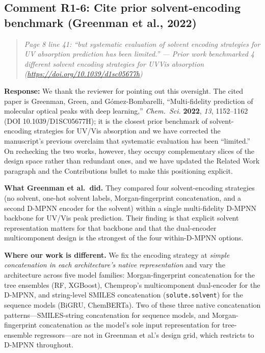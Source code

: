 \documentclass[11pt]{article}
\newenvironment{reviewer}{%
  \begin{quote}\itshape\color{black!70}}{%
  \end{quote}}
\newcommand{\response}[1]{\noindent\textbf{Response:} #1\par\medskip}
\begin{document}
\subsection*{Comment R1-6: Cite prior solvent-encoding benchmark (Greenman et al., 2022)}
\begin{reviewer}
Page 8 line 41: ``but systematic evaluation of solvent encoding strategies for UV absorption prediction has been limited.'' --- Prior work benchmarked 4 different solvent encoding strategies for UVVis absorption (\url{https://doi.org/10.1039/d1sc05677h})
\end{reviewer}

\response{We thank the reviewer for pointing out this oversight. The cited paper is Greenman, Green, and G\'omez-Bombarelli, ``Multi-fidelity prediction of molecular optical peaks with deep learning,'' \textit{Chem.\ Sci.} \textbf{2022}, \textit{13}, 1152--1162 (DOI 10.1039/D1SC05677H); it is the closest prior benchmark of solvent-encoding strategies for UV/Vis absorption and we have corrected the manuscript's previous overclaim that systematic evaluation has been ``limited.'' On rechecking the two works, however, they occupy complementary slices of the design space rather than redundant ones, and we have updated the Related Work paragraph and the Contributions bullet to make this positioning explicit.

\textbf{What Greenman et al.\ did.} They compared four solvent-encoding strategies (no solvent, one-hot solvent labels, Morgan-fingerprint concatenation, and a second D-MPNN encoder for the solvent) within a single multi-fidelity D-MPNN backbone for UV/Vis peak prediction. Their finding is that explicit solvent representation matters for that backbone and that the dual-encoder multicomponent design is the strongest of the four within-D-MPNN options.

\textbf{Where our work is different.} We fix the encoding strategy at \emph{simple concatenation in each architecture's native representation} and vary the architecture across five model families: Morgan-fingerprint concatenation for the tree ensembles (RF, XGBoost), Chemprop's multicomponent dual-encoder for the D-MPNN, and string-level SMILES concatenation (\texttt{solute.solvent}) for the sequence models (BiGRU, ChemBERTa). Two of these three native concatenation patterns---SMILES-string concatenation for sequence models, and Morgan-fingerprint concatenation as the model's sole input representation for tree-ensemble regressors---are not in Greenman et al.'s design grid, which restricts to D-MPNN throughout.

}
\end{document}
